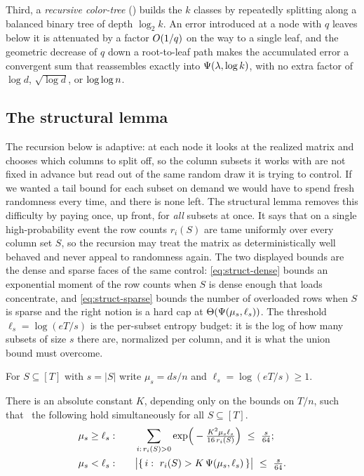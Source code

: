 Third, a \emph{recursive color-tree} () builds the $k$ classes by repeatedly splitting along a
balanced binary tree of depth $\log_2 k$. An error introduced at a node with $q$ leaves below it is attenuated by a factor
$O(1/q)$ on the way to a single leaf, and the geometric decrease of $q$ down a root-to-leaf path makes the accumulated
error a convergent sum that reassembles exactly into $\Psi(\lambda,\log k)$, with no extra factor of $\log d$, $\sqrt{\log d}$,
or $\log\log n$.

\subsection{The structural lemma}\label{sec:structural}

The recursion below is adaptive: at each node it looks at the realized matrix and chooses which columns to split off, so the
column subsets it works with are not fixed in advance but read out of the same random draw it is trying to control. If we
wanted a tail bound for each subset on demand we would have to spend fresh randomness every time, and there is none left.
The structural lemma removes this difficulty by paying once, up front, for \emph{all} subsets at once. It says that on a
single high-probability event the row counts $r_i(S)$ are tame uniformly over every column set $S$, so the recursion may
treat the matrix as deterministically well behaved and never appeal to randomness again. The two displayed bounds are the
dense and sparse faces of the same control: \eqref{eq:struct-dense} bounds an exponential moment of the row counts when $S$
is dense enough that loads concentrate, and \eqref{eq:struct-sparse} bounds the number of overloaded rows when $S$ is sparse
and the right notion is a hard cap at $\Theta(\Psi(\mu_s,\ell_s))$. The threshold $\ell_s=\log(eT/s)$ is the per-subset entropy
budget: it is the log of how many subsets of size $s$ there are, normalized per column, and it is what the union bound must
overcome.

For $S\subseteq[T]$ with $s=|S|$ write $\mu_s=ds/n$ and $\ell_s=\log(eT/s)\ge 1$.

\begin{lemma}\label{lem:structural}
There is an absolute constant $K$, depending only on the bounds on $T/n$, such that \whp\ the following hold
simultaneously for all $S\subseteq[T]$.
\begin{align}
  \mu_s\ge\ell_s:&\qquad \sum_{i:\,r_i(S)>0}\exp\!\Big(-\tfrac{K^2\mu_s\ell_s}{16\,r_i(S)}\Big)\ \le\ \tfrac{s}{64};
    \label{eq:struct-dense}\\
  \mu_s<\ell_s:&\qquad \big|\{\,i:\ r_i(S)>K\,\Psifn(\mu_s,\ell_s)\,\}\big|\ \le\ \tfrac{s}{64}.
    \label{eq:struct-sparse}
\end{align}
\end{lemma}

